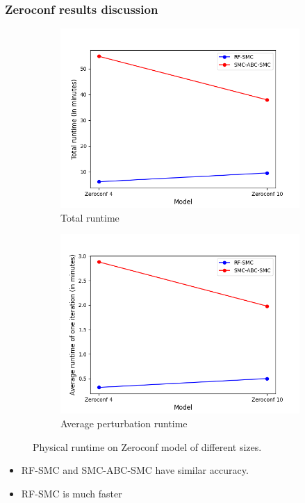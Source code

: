 \documentclass{beamer}
\begin{document}
\begin{frame}
    \frametitle{Zeroconf results discussion}
    \begin{figure}[H]
        \centering
        \begin{subfigure}{0.3\textwidth}
            \centering
            \includegraphics[width=\linewidth]{figures/zeroconf_runtime_total.png}
            \caption{Total runtime}
        \end{subfigure}
        \hfill
        \begin{subfigure}{0.3\textwidth}
            \centering
            \includegraphics[width=\linewidth]{figures/zeroconf_runtime_avg.png}
            \caption{Average perturbation runtime}
        \end{subfigure}
        \caption{Physical runtime on Zeroconf model of different sizes.}
    \end{figure}
    \begin{itemize}
        \item RF-SMC and SMC-ABC-SMC have similar accuracy.
        \item RF-SMC is much faster
    \end{itemize}
\end{frame}
\end{document}
